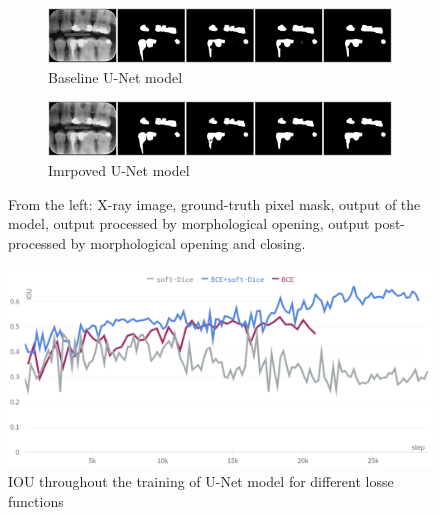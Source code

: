 \begin{figure}[h]
    \centering
    \begin{subfigure}[b]{\textwidth}
        \includegraphics[width=1\linewidth]{images/unet_1_img_12.pdf}
        \caption{Baseline U-Net model}
    \end{subfigure}

    \begin{subfigure}[b]{\textwidth}
        \includegraphics[width=1\linewidth]{images/unet_2_img_12.pdf}
        \caption{Imrpoved U-Net model}
    \end{subfigure}
    \caption{From the left: X-ray image, ground-truth pixel mask, output of the model, output processed by morphological opening, output post-processed by morphological opening and closing.}
    \label{fig:segmentation_unet_sample}
\end{figure}
\begin{figure}
    \centering
    \includegraphics[width=0.8\linewidth]{images/segmentation_losses.png}
    \caption{IOU throughout the training of U-Net model for different losse functions}
    \label{fig:segmentation_losses}
\end{figure}

